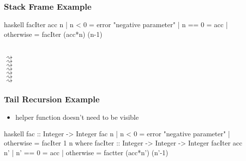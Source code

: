\documentclass[dvipsnames]{beamer}
\theoremstyle{plain}
\begin{document}
\begin{frame}[fragile]
  \frametitle{Stack Frame Example}

  \begin{exampleblock}{}
    \begin{pygments}{haskell}
facIter acc n
  | n < 0     = error "negative parameter"
  | n == 0    = acc
  | otherwise = facIter (acc*n) (n-1)
    \end{pygments}

    \\
    $\rightsquigarrow$ \\
    \hspace{16pt}$\rightsquigarrow$ \\
    \hspace{16pt}$\rightsquigarrow$ \\
    \hspace{16pt}$\rightsquigarrow$ \\
    \hspace{16pt}$\rightsquigarrow$ \\
    \hspace{16pt}$\rightsquigarrow$ \\
    $\rightsquigarrow$ \\
  \end{exampleblock}
\end{frame}

\begin{frame}[fragile]
  \frametitle{Tail Recursion Example}

  \begin{itemize}
    \item helper function doesn't need to be visible
  \end{itemize}

  \begin{exampleblock}{}
    \begin{pygments}{haskell}
fac :: Integer -> Integer
fac n
  | n < 0     = error "negative parameter"
  | otherwise = facIter 1 n
      where
        facIter :: Integer -> Integer -> Integer
        facIter acc n'
          | n' == 0   = acc
          | otherwise = factter (acc*n') (n'-1)
    \end{pygments}
  \end{exampleblock}
\end{frame}
\end{document}
